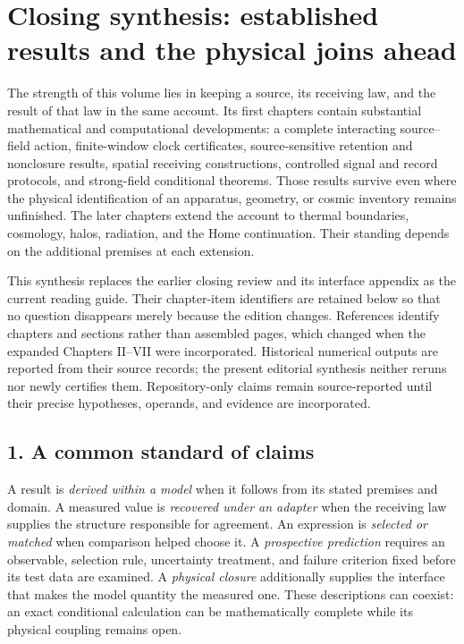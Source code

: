 \section*{Closing synthesis: established results and the physical joins ahead}

The strength of this volume lies in keeping a source, its receiving law, and the result of that law in the same account. Its first chapters contain substantial mathematical and computational developments: a complete interacting source--field action, finite-window clock certificates, source-sensitive retention and nonclosure results, spatial receiving constructions, controlled signal and record protocols, and strong-field conditional theorems. Those results survive even where the physical identification of an apparatus, geometry, or cosmic inventory remains unfinished. The later chapters extend the account to thermal boundaries, cosmology, halos, radiation, and the Home continuation. Their standing depends on the additional premises at each extension.

This synthesis replaces the earlier closing review and its interface appendix as the current reading guide. Their chapter-item identifiers are retained below so that no question disappears merely because the edition changes. References identify chapters and sections rather than assembled pages, which changed when the expanded Chapters II--VII were incorporated. Historical numerical outputs are reported from their source records; the present editorial synthesis neither reruns nor newly certifies them. Repository-only claims remain source-reported until their precise hypotheses, operands, and evidence are incorporated.

\subsection*{1. A common standard of claims}

A result is \emph{derived within a model} when it follows from its stated premises and domain. A measured value is \emph{recovered under an adapter} when the receiving law supplies the structure responsible for agreement. An expression is \emph{selected or matched} when comparison helped choose it. A \emph{prospective prediction} requires an observable, selection rule, uncertainty treatment, and failure criterion fixed before its test data are examined. A \emph{physical closure} additionally supplies the interface that makes the model quantity the measured one. These descriptions can coexist: an exact conditional calculation can be mathematically complete while its physical coupling remains open.


